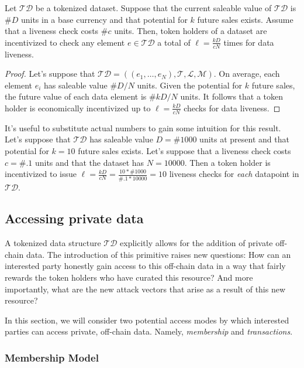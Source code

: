 \documentclass{llncs}
\begin{document}
\begin{theorem} Let $\mathcal{TD}$ be a tokenized dataset. Suppose that the current saleable value of $\mathcal{TD}$ is $\#D$ units in a base currency and that potential for $k$ future sales exists. Assume that a liveness check costs $\#c$ units. Then, token holders of a dataset are incentivized to check any element $e \in \mathcal{TD}$ a total of $\ell = \frac{kD}{cN}$ times for data liveness.\end{theorem}
\begin{proof}
Let's suppose that $\mathcal{TD} = ((e_1,\dotsc,e_N), \mathcal{T}, \mathcal{L}, \mathcal{M})$. On average, each element $e_i$ has saleable value $\#D/N$ units. Given the potential for $k$ future sales, the future value of each data element is $\#kD/N$ units. It follows that a token holder is economically incentivized up to $\ell = \frac{kD}{cN}$ checks for data liveness.
\end{proof}

It's useful to substitute actual numbers to gain some intuition for this result. Let's suppose that $\mathcal{TD}$ has saleable value $D=\#1000$ units at present and that potential for $k=10$ future sales exists. Let's suppose that a liveness check costs $c=\#.1$ units and that the dataset has $N=10000$. Then a token holder is incentivized to issue $\ell=\frac{kD}{cN} = \frac{10*\#1000}{\#.1 * 10000} = 10$ liveness checks for \textit{each} datapoint in $\mathcal{TD}$.

\subsection{Accessing private data}

A tokenized data structure $\mathcal{TD}$ explicitly allows for the addition of private off-chain data. The introduction of this primitive raises new questions: How can an interested party honestly gain access to this off-chain data in a way that fairly rewards the token holders who have curated this resource? And more importantly, what are the new attack vectors that arise as a result of this new resource?

In this section, we will consider two potential access modes by which interested parties can access private, off-chain data. Namely, \textit{membership} and \textit{transactions}.

\subsubsection{Membership Model}
\end{document}

